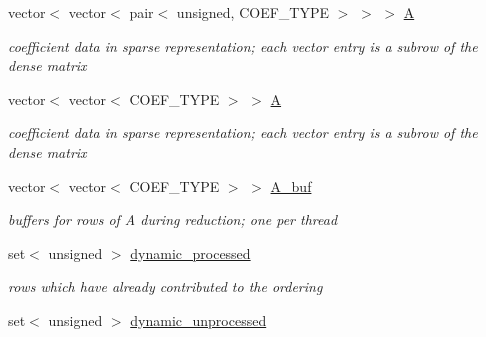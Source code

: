 \begin{DoxyCompactItemize}
\item 
\mbox{\label{group___g_b_computation_aefa417ab77667256a1f21d54f95c264a}} 
vector$<$ vector$<$ pair$<$ unsigned, C\+O\+E\+F\+\_\+\+T\+Y\+PE $>$ $>$ $>$ \hyperlink{group___g_b_computation_aefa417ab77667256a1f21d54f95c264a}{A}
\begin{DoxyCompactList}\small\item\em coefficient data in sparse representation; each vector entry is a subrow of the dense matrix \end{DoxyCompactList}\item 
\mbox{\label{group___g_b_computation_ae99b64462e7d5f0aef6f196a4bc5c4cd}} 
vector$<$ vector$<$ C\+O\+E\+F\+\_\+\+T\+Y\+PE $>$ $>$ \hyperlink{group___g_b_computation_ae99b64462e7d5f0aef6f196a4bc5c4cd}{A}
\begin{DoxyCompactList}\small\item\em coefficient data in sparse representation; each vector entry is a subrow of the dense matrix \end{DoxyCompactList}\item 
\mbox{\label{group___g_b_computation_aba5553e4748985f3adb1a20de2d9edd4}} 
vector$<$ vector$<$ C\+O\+E\+F\+\_\+\+T\+Y\+PE $>$ $>$ \hyperlink{group___g_b_computation_aba5553e4748985f3adb1a20de2d9edd4}{A\+\_\+buf}
\begin{DoxyCompactList}\small\item\em buffers for rows of A during reduction; one per thread \end{DoxyCompactList}\item 
\mbox{\label{group___g_b_computation_aa0e72696183319ea37b7b88e4772037e}} 
set$<$ unsigned $>$ \hyperlink{group___g_b_computation_aa0e72696183319ea37b7b88e4772037e}{dynamic\+\_\+processed}
\begin{DoxyCompactList}\small\item\em rows which have already contributed to the ordering \end{DoxyCompactList}\item 
\mbox{\label{group___g_b_computation_ae0c89b189358ae0d5f11599f6e40cdd4}} 
set$<$ unsigned $>$ \hyperlink{group___g_b_computation_ae0c89b189358ae0d5f11599f6e40cdd4}{dynamic\+\_\+unprocessed}

\end{DoxyCompactItemize}
